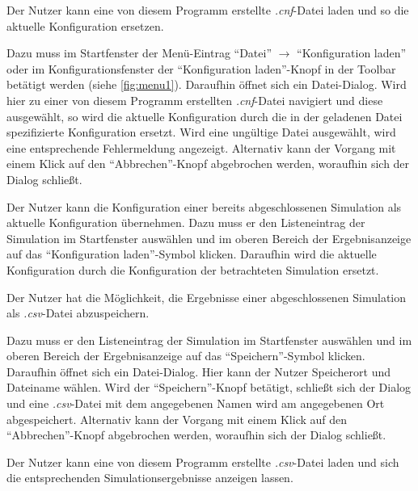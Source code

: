 \documentclass[parskip=full,11pt]{scrartcl}
\begin{document}
Der \Gls{Nutzer} kann eine von diesem Programm erstellte \textit{.cnf}-Datei laden und so die \gls{aktuelle Konfiguration} ersetzen.

Dazu muss im Startfenster der Menü-Eintrag \enquote{Datei} \(\rightarrow\) \enquote{\Gls{Konfiguration} laden} oder im Konfigurationsfenster der \enquote{\Gls{Konfiguration} laden}-Knopf in der Toolbar betätigt werden (siehe \cref{fig:menu1}). Daraufhin öffnet sich ein Datei-Dialog. Wird hier zu einer von diesem Programm erstellten \textit{.cnf}-Datei navigiert und diese ausgewählt, so wird die \gls{aktuelle Konfiguration} durch die in der geladenen Datei spezifizierte \Gls{Konfiguration} ersetzt. Wird eine ungültige Datei ausgewählt, wird eine entsprechende Fehlermeldung angezeigt. Alternativ kann der Vorgang mit einem Klick auf den \enquote{Abbrechen}-Knopf abgebrochen werden, woraufhin sich der Dialog schließt.

Der \Gls{Nutzer} kann die \Gls{Konfiguration} einer bereits abgeschlossenen Simulation als \gls{aktuelle Konfiguration} übernehmen. Dazu muss er den Listeneintrag der Simulation im Startfenster auswählen und im oberen Bereich der Ergebnisanzeige auf das \enquote{\Gls{Konfiguration} laden}-Symbol klicken. Daraufhin wird die \gls{aktuelle Konfiguration} durch die \Gls{Konfiguration} der betrachteten Simulation ersetzt.

Der \Gls{Nutzer} hat die Möglichkeit, die Ergebnisse einer abgeschlossenen Simulation als \textit{.csv}-Datei abzuspeichern.

Dazu muss er den Listeneintrag der Simulation im Startfenster auswählen und im oberen Bereich der Ergebnisanzeige auf das \enquote{Speichern}-Symbol klicken. Daraufhin öffnet sich ein Datei-Dialog. Hier kann der \Gls{Nutzer} Speicherort und Dateiname wählen. Wird der \enquote{Speichern}-Knopf betätigt, schließt sich der Dialog und eine \textit{.csv}-Datei mit dem angegebenen Namen wird am angegebenen Ort abgespeichert. Alternativ kann der Vorgang mit einem Klick auf den \enquote{Abbrechen}-Knopf abgebrochen werden, woraufhin sich der Dialog schließt.

Der \Gls{Nutzer} kann eine von diesem Programm erstellte \textit{.csv}-Datei laden und sich die entsprechenden Simulationsergebnisse anzeigen lassen.
\end{document}
